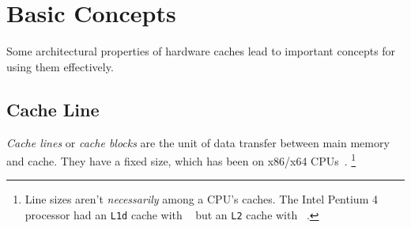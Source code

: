 \section{Basic Concepts}
Some architectural properties of hardware caches lead to important concepts for using them
effectively.

\subsection{Cache Line} %
%
\emph{Cache lines} or \emph{cache blocks} are the unit of data transfer between main
memory and cache.  They have a fixed size, which has been  on
x86/x64 CPUs~\cites{ithare-paadl}[\href{https://youtu.be/WDIkqP4JbkE?t=21m41s}{21:41}]
{scott-meyers-talk}.%
\footnote{%
Line sizes aren't \emph{necessarily}  among a CPU's caches.
The Intel Pentium 4 processor had an \texttt{L1d} cache with ~\cite[p.~9]{pentium4} but an \texttt{L2} cache with ~\cite[p.~11]{pentium4}.}
\begin{comment}
   \multiplefootnoteseparator%
   \footnote{This can also be checked on the command line:
   \texttt{cat /proc/cpuinfo | grep cache_alignment}}
\end{comment}

